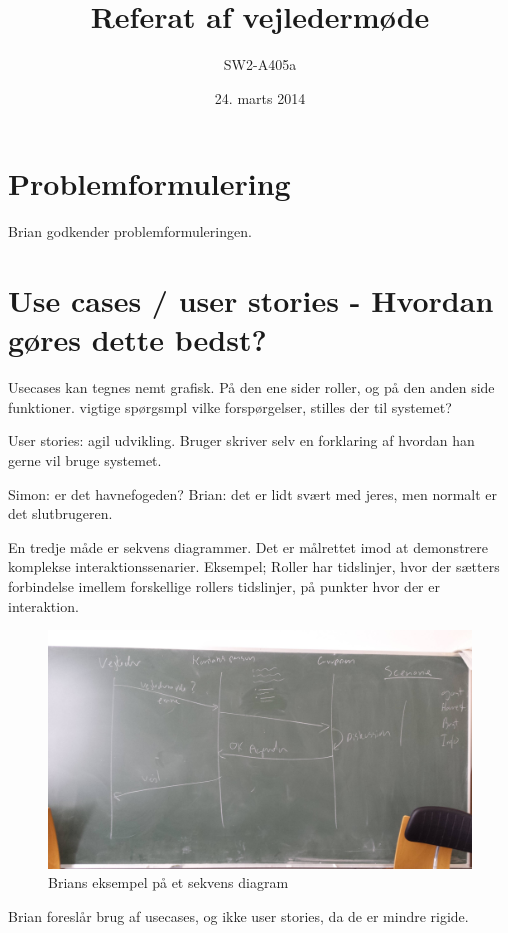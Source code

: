 \documentclass{article}
\begin{document}
\title{Referat af vejledermøde}
\author{SW2-A405a}
\date{24. marts 2014}
\maketitle
\section{Problemformulering}
Brian godkender problemformuleringen.

\section{Use cases / user stories - Hvordan gøres dette bedst?}
Usecases kan tegnes nemt grafisk. På den ene sider roller, og på den anden side funktioner. vigtige spørgsmpl vilke forspørgelser, stilles der til systemet?

User stories: agil udvikling. Bruger skriver selv en forklaring af hvordan han gerne vil bruge systemet.

Simon: er det havnefogeden? Brian: det er lidt svært med jeres, men normalt er det slutbrugeren.

En tredje måde er sekvens diagrammer. Det er målrettet imod at demonstrere komplekse interaktionssenarier. Eksempel; Roller har tidslinjer, hvor der sætters forbindelse imellem forskellige rollers tidslinjer, på punkter hvor der er interaktion.

\begin{figure}[h]
  \caption{Brians eksempel på et sekvens diagram}
  \centering
    \includegraphics[width=1\textwidth]{sekvensdiagrammer}
\end{figure}

Brian foreslår brug af usecases, og ikke user stories, da de er mindre rigide.
\end{document}
